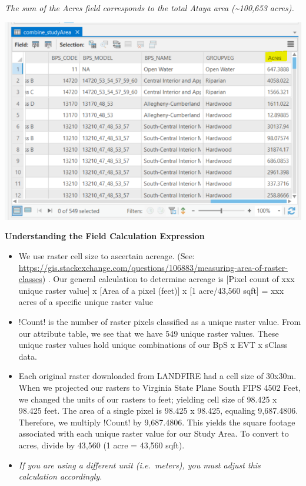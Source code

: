 \documentclass[
]{book}
\providecommand{\tightlist}{%
  \setlength{\itemsep}{0pt}\setlength{\parskip}{0pt}}
\begin{document}
\emph{The sum of the Acres field corresponds to the total Ataya area (\textasciitilde100,653 acres).}

\includegraphics[width=1000px]{04_gis_screenshots/17_check_area_calc}

\textbf{Understanding the Field Calculation Expression}

\begin{itemize}
\tightlist
\item
  We use raster cell size to ascertain acreage. (See: \url{https://gis.stackexchange.com/questions/106883/measuring-area-of-raster-classes}) . Our general calculation to determine acreage is {[}Pixel count of xxx unique raster value{]} x {[}Area of a pixel (feet){]} x {[}1 acre/43,560 sqft{]} = xxx acres of a specific unique raster value
\item
  !Count! is the number of raster pixels classified as a unique raster value. From our attribute table, we see that we have 549 unique raster values. These unique raster values hold unique combinations of our BpS x EVT x sClass data.
\item
  Each original raster downloaded from LANDFIRE had a cell size of 30x30m. When we projected our rasters to Virginia State Plane South FIPS 4502 Feet, we changed the units of our rasters to feet; yielding cell size of 98.425 x 98.425 feet. The area of a single pixel is 98.425 x 98.425, equaling 9,687.4806. Therefore, we multiply !Count! by 9,687.4806. This yields the square footage associated with each unique raster value for our Study Area. To convert to acres, divide by 43,560 (1 acre = 43,560 sqft).
\item
  \emph{If you are using a different unit (i.e.~meters), you must adjust this calculation accordingly.}
\end{itemize}
\end{document}
